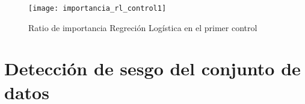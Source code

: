 \begin{figure}[H]
  \centering
  \texttt{[image: importancia\_rl\_control1]}
  \caption{Ratio de importancia Regreción Logística en el primer control}
  \label{fig:k-nn-example}
\end{figure}



\section{Detección de sesgo del conjunto de datos}

\endinput
